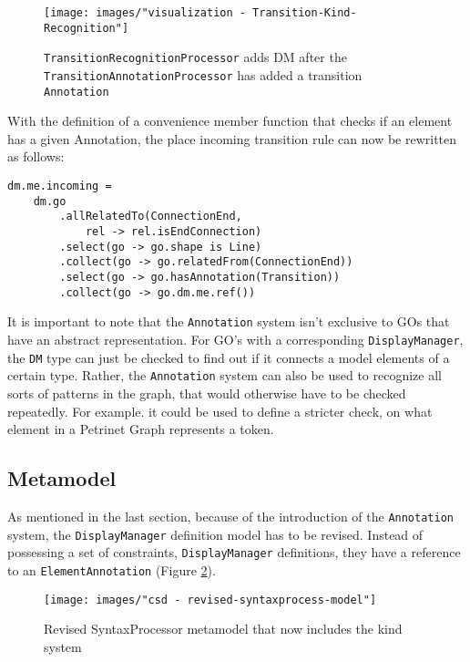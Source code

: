 \begin{figure}[ht]
\centering
\texttt{[image: images/"visualization - Transition-Kind-Recognition"]}
\caption{\texttt{TransitionRecognitionProcessor} adds DM after the \texttt{TransitionAnnotationProcessor} has added a transition \texttt{Annotation}}
\label{fig:Transition-Kind-Recognition}
\end{figure}

With the definition of a convenience member function that checks if an element has a given Annotation, the place incoming transition rule can now be rewritten as follows: 
\begin{lstlisting}[captionpos=b,caption={Improved incoming transition \texttt{Rule}, that also filters for elements with a \texttt{Transition} annotation}]
dm.me.incoming = 
    dm.go
        .allRelatedTo(ConnectionEnd,
            rel -> rel.isEndConnection)
        .select(go -> go.shape is Line)
        .collect(go -> go.relatedFrom(ConnectionEnd))
        .select(go -> go.hasAnnotation(Transition))
        .collect(go -> go.dm.me.ref())
\end{lstlisting}


It is important to note that the \texttt{Annotation} system isn't exclusive to GOs that have an abstract representation. For GO's with a corresponding \texttt{DisplayManager}, the \texttt{DM} type can just be checked to find out if it connects a model elements of a certain type. Rather, the \texttt{Annotation} system can also be used to recognize all sorts of patterns in the graph, that would otherwise have to be checked repeatedly. For example. it could be used to define a stricter check, on what element in a Petrinet Graph represents a token.

\subsection{Metamodel}
As mentioned in the last section, because of the introduction of the \texttt{Annotation} system, the \texttt{DisplayManager} definition model has to be revised. Instead of possessing a set of constraints, \texttt{DisplayManager} definitions, they have a reference to an \texttt{ElementAnnotation} (Figure \ref{fig:revised-syntax-model}).

\begin{figure}
\centering
\texttt{[image: images/"csd - revised-syntaxprocess-model"]}
\caption{Revised SyntaxProcessor metamodel that now includes the kind system}
\label{fig:revised-syntax-model}
\end{figure}


